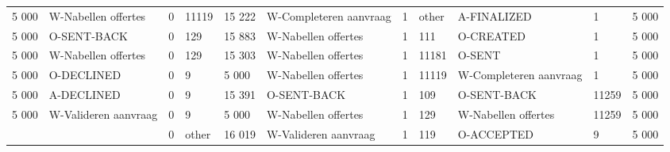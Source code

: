 \begin{tabular}{llllllllllr}
5 000 & W-Nabellen offertes & 0 & 11119 & 15 222 & W-Completeren aanvraag & 1 & other & A-FINALIZED & 1 & 5 000 \\
5 000 & O-SENT-BACK & 0 & 129 & 15 883 & W-Nabellen offertes & 1 & 111 & O-CREATED & 1 & 5 000 \\
5 000 & W-Nabellen offertes & 0 & 129 & 15 303 & W-Nabellen offertes & 1 & 11181 & O-SENT & 1 & 5 000 \\
5 000 & O-DECLINED & 0 & 9 & 5 000 & W-Nabellen offertes & 1 & 11119 & W-Completeren aanvraag & 1 & 5 000 \\
5 000 & A-DECLINED & 0 & 9 & 15 391 & O-SENT-BACK & 1 & 109 & O-SENT-BACK & 11259 & 5 000 \\
5 000 & W-Valideren aanvraag & 0 & 9 & 5 000 & W-Nabellen offertes & 1 & 129 & W-Nabellen offertes & 11259 & 5 000 \\
 &  & 0 & other & 16 019 & W-Valideren aanvraag & 1 & 119 & O-ACCEPTED & 9 & 5 000 \\
\bottomrule
\end{tabular}
